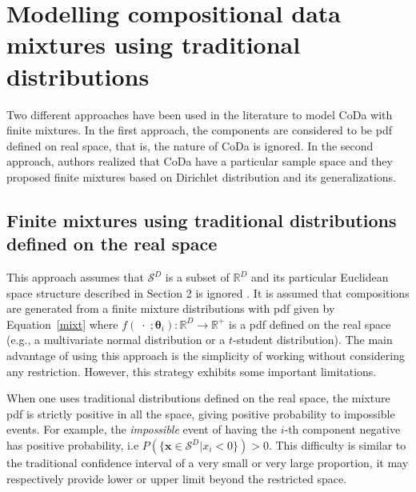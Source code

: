 \documentclass[12pt, a4paper]{article}
\newcommand{\m}[1]{\boldsymbol{#1}}
\begin{document}

\section{Modelling compositional data mixtures using traditional distributions}
\label{standard_section}

\noindent Two different approaches have been used in the literature to model CoDa with finite mixtures. 
In the first approach,  the components are considered to be pdf defined on real space, that is, the nature of CoDa is ignored. In the second approach, authors realized that CoDa have a particular sample space and they proposed finite mixtures based on Dirichlet distribution and its generalizations.


\subsection{Finite mixtures using traditional distributions defined on the real space}
\label{real_section}

This approach assumes that $\mathcal{S}^D$ is a subset of $\mathbb{R}^D$ and its particular Euclidean space structure described in Section 2 is ignored \citep[][]{papageorgiou2001model}. It is assumed that compositions  are generated from a finite mixture distributions with pdf given by Equation~\ref{mixt} where $f(\;\cdot\;;\m\theta_i): \mathbb{R}^D \rightarrow \mathbb{R}^+$ is a pdf defined on the real space (e.g., a multivariate normal distribution or a  $t$-student distribution). The main advantage of using this approach is the simplicity of working without considering any restriction. However, this strategy exhibits some important limitations.

When one uses traditional distributions defined on the real space, the mixture pdf is strictly positive in all the space, giving positive probability to impossible events. For example, the \emph{impossible} event  of having the $i$-th component negative has positive probability, i.e $P(\{ \textbf{x} \in \mathcal{S}^D | x_i < 0 \}) > 0$. This difficulty is similar to the traditional confidence interval of a very small or very large proportion, it may respectively provide lower or upper limit beyond the restricted space. 
\end{document}
